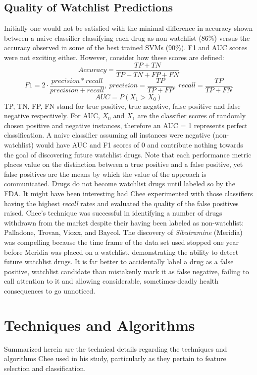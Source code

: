 \documentclass[twoside,11pt]{article}
\begin{document}
\subsection{Quality of Watchlist Predictions}
Initially one would not be satisfied with the minimal difference in accuracy shown between a naive classifier classifying each drug as non-watchlist (86\%) versus the accuracy observed in some of the best trained SVMs (90\%). F1 and AUC scores were not exciting either. However, consider how these scores are defined:
\[
  Accuracy = \frac{TP + TN}{TP + TN + FP + FN}
\]
\[
  F1 = 2 \cdot \frac{precision * recall}{precision + recall}, \ precision = \frac{TP}{TP+FP},\ recall = \frac{TP}{TP+FN}
\]
\[
  AUC = P(X_{1} > X_{0})
\]
TP, TN, FP, FN stand for true positive, true negative, false positive and false negative respectively. For AUC, $X_{0}$ and $X_{1}$ are the classifier scores of randomly chosen positive and negative instances, therefore an AUC = 1 represents perfect classification. A naive classifier assuming all instances were negative (non-watchlist) would have AUC and F1 scores of 0 and contribute nothing towards the goal of discovering future watchlist drugs. Note that each performance metric places value on the distinction between a true positive and a false positive, yet false positives are the means by which the value of the approach is communicated. Drugs do not become watchlist drugs until labeled so by the FDA. It might have been interesting had Chee experimented with those classifiers having the highest \textit{recall} rates and evaluated the quality of the false positives raised.
Chee's technique was successful in identifying a number of drugs withdrawn from the market despite their having been labeled as non-watchlist:  Palladone,  Trovan, Vioxx, and Baycol. The discovery of \textit{Sibutramine} (Meridia) was compelling because the time frame of the data set used stopped one year before Meridia was placed on a watchlist, demonstrating the ability to detect future watchlist drugs. It is far better to accidentally label a drug as a false positive, watchlist candidate than mistakenly mark it as false negative, failing to call attention to it and allowing considerable, sometimes-deadly health consequences to go unnoticed.

\section{Techniques and Algorithms}
Summarized herein are the technical details regarding the techniques and algorithms Chee used in his study, particularly as they pertain to feature selection and classification.
\end{document}

